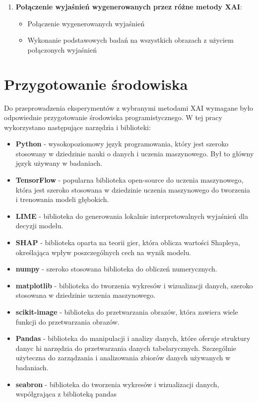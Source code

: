 \begin{enumerate}
	\item \textbf{Połączenie wyjaśnień wygenerowanych przez różne metody XAI}:
	      \begin{itemize}
		      \item Połączenie wygenerowanych wyjaśnień
		      \item Wykonanie podstawowych badań na wszystkich obrazach z użyciem połączonych wyjaśnień
	      \end{itemize}
\end{enumerate}

\section*{Przygotowanie środowiska}

Do przeprowadzenia eksperymentów z wybranymi metodami XAI wymagane było odpowiednie przygotowanie środowiska programistycznego.
W tej pracy wykorzystano  następujące narzędzia i biblioteki:
\begin{itemize}
	\item \textbf{Python}\cite{python} - wysokopoziomowy język programowania, który jest szeroko stosowany w dziedzinie nauki o danych i uczenia maszynowego.
	      Był to główny język używany w badaniach.
	\item \textbf{TensorFlow}\cite{tensorflow} - popularna biblioteka open-source do uczenia maszynowego, która jest szeroko stosowana w dziedzinie uczenia maszynowego do tworzenia i trenowania modeli głębokich.
    \item \textbf{LIME}\cite{limedoc} - biblioteka do generowania lokalnie interpretowalnych wyjaśnień dla decyzji modelu.
    \item \textbf{SHAP}\cite{shapdoc} - biblioteka oparta na teorii gier, która oblicza wartości Shapleya, określająca wpływ poszczególnych cech na wynik modelu.
    \item \textbf{numpy}\cite{numpy} - szeroko stosowana biblioteka do obliczeń numerycznych.
    \item \textbf{matplotlib}\cite{matplotlib} - biblioteka do tworzenia wykresów i wizualizacji danych, szeroko stosowana w dziedzinie uczenia maszynowego.
    \item \textbf{scikit-image}\cite{scikitimage} - biblioteka do przetwarzania obrazów, która zawiera wiele funkcji do przetwarzania obrazów.
    \item \textbf{Pandas}\cite{pandas} - biblioteka do manipulacji i analizy danych, które oferuje struktury danyc hi narzędzia do przetwarzania danych tabelarycznych.
	      Szczególnie użyteczna do zarządzania i analizowania zbiorów danych używanych w badaniach.
      \item \textbf{seabron}\cite{seaborn} - biblioteka do tworzenia wykresów i wizualizacji danych, współgrająca z biblioteką pandas
\end{itemize}

